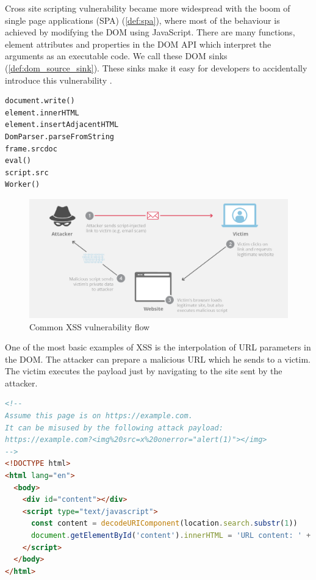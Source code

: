 Cross site scripting vulnerability became more widespread with the boom of single page applications
(SPA) (\ref{def:spa}), where most of the behaviour is achieved by modifying the DOM using
JavaScript. There are many functions, element attributes and properties in the DOM API which
interpret the arguments as an executable code. We call these DOM sinks (\ref{def:dom_source_sink}).
These sinks make it easy for developers to accidentally introduce this vulnerability
\cite{tt_web_framework_paper}.

\bigskip
\begin{lstlisting}[language={}, caption=Common DOM XSS sinks \cite{dom_xss_portswigger} \cite{tt_web_framework_paper}]
document.write()
element.innerHTML
element.insertAdjacentHTML
DomParser.parseFromString
frame.srcdoc
eval()
script.src
Worker()
\end{lstlisting}

\begin{figure}[H]
  \centerline{\includegraphics[width=1\textwidth]{images/xss-attack.png}}
  \caption[Common XSS vulnerability flow \cite{xss_image}]{Common XSS vulnerability flow \cite{xss_image}}
  \label{img:xss}
\end{figure}

One of the most basic examples of XSS is the interpolation of URL parameters in the DOM. The
attacker can prepare a malicious URL which he sends to a victim. The victim executes the payload
just by navigating to the site sent by the attacker.

\bigskip
\begin{lstlisting}[language=HTML, caption=Basic example of XSS via unsafe URL parameter interpolation]
<!--
Assume this page is on https://example.com.
It can be misused by the following attack payload:
https://example.com?<img%20src=x%20onerror="alert(1)"></img>
-->
<!DOCTYPE html>
<html lang="en">
  <body>
    <div id="content"></div>
    <script type="text/javascript">
      const content = decodeURIComponent(location.search.substr(1))
      document.getElementById('content').innerHTML = 'URL content: ' + content
    </script>
  </body>
</html>
\end{lstlisting}

